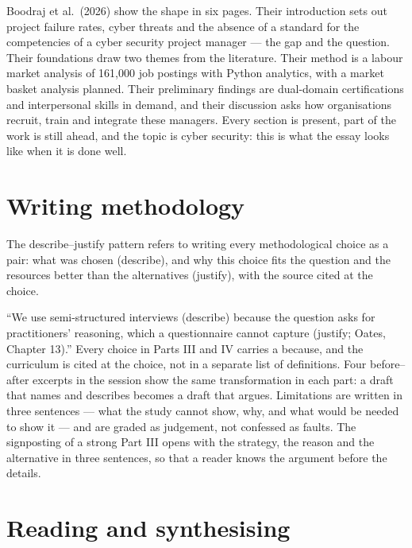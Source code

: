 \documentclass[11pt,a4paper,british,twoside=false,headings=small,chapterprefix=false,numbers=noenddot]{scrbook}
\newenvironment{block}[1]{\begin{tcolorbox}[scriptbox, title={#1}]}{\end{tcolorbox}}
\begin{document}
Boodraj et al.\ (2026) show the shape in six pages. Their introduction sets out project failure rates, cyber threats and the absence of a standard for the competencies of a cyber security project manager --- the gap and the question. Their foundations draw two themes from the literature. Their method is a labour market analysis of 161,000 job postings with Python analytics, with a market basket analysis planned. Their preliminary findings are dual-domain certifications and interpersonal skills in demand, and their discussion asks how organisations recruit, train and integrate these managers. Every section is present, part of the work is still ahead, and the topic is cyber security: this is what the essay looks like when it is done well.

\section{Writing methodology}

\begin{block}{Describe--justify}
The describe--justify pattern refers to writing every methodological choice as a pair: what was chosen (describe), and why this choice fits the question and the resources better than the alternatives (justify), with the source cited at the choice.
\end{block}

``We use semi-structured interviews (describe) because the question asks for practitioners' reasoning, which a questionnaire cannot capture (justify; Oates, Chapter 13).'' Every choice in Parts III and IV carries a because, and the curriculum is cited at the choice, not in a separate list of definitions. Four before--after excerpts in the session show the same transformation in each part: a draft that names and describes becomes a draft that argues. Limitations are written in three sentences --- what the study cannot show, why, and what would be needed to show it --- and are graded as judgement, not confessed as faults. The signposting of a strong Part III opens with the strategy, the reason and the alternative in three sentences, so that a reader knows the argument before the details.

\section{Reading and synthesising}
\end{document}
